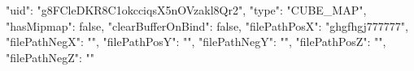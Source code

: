 {
    "uid": "g8FCleDKR8C1okcciqsX5nOVzakl8Qr2",
    "type": "CUBE_MAP",
    "hasMipmap": false,
    "clearBufferOnBind": false,
    "filePathPosX": "ghgfhgj777777",
    "filePathNegX": "",
    "filePathPosY": "",
    "filePathNegY": "",
    "filePathPosZ": "",
    "filePathNegZ": ""
}